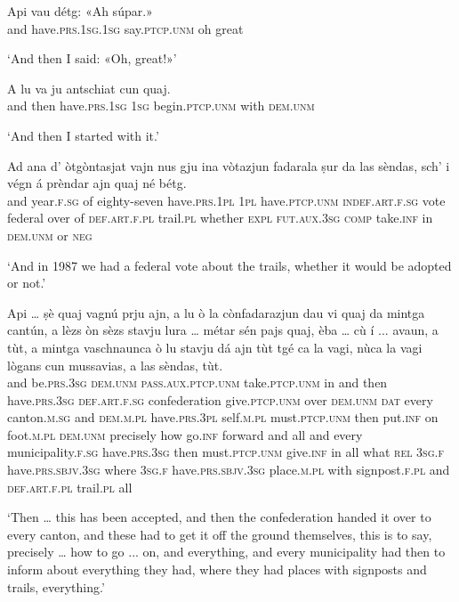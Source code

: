 \begin{linenumbers}
\gll Api vau détg: «Ah súpar.»\\
and have.\textsc{prs.1sg.1sg} say.\textsc{ptcp.unm} oh great\\
\end{linenumbers}
\medskip
\glt `And then I said: «Oh, great!»'
\medskip

\begin{linenumbers}
\gll  A lu va ju antschiat cun quaj.  \\
and then have.\textsc{prs.1sg} \textsc{1sg} begin.\textsc{ptcp.unm} with \textsc{dem.unm}\\
\end{linenumbers}
\medskip
\glt `And then I started with it.'
\medskip

\begin{linenumbers}
\gll Ad ana d' òtgòntasjat vajn nus gju ina vòtazjun fadarala ṣur da las sèndas, sch' i végn á prèndar ajn quaj né bétg.   \\
and year.\textsc{f.sg} of eighty-seven have.\textsc{prs.1pl} \textsc{1pl} have.\textsc{ptcp.unm} \textsc{indef.art.f.sg} vote federal over of \textsc{def.art.f.pl} trail.\textsc{pl} whether \textsc{expl} \textsc{fut.aux.3sg} \textsc{comp} take.\textsc{inf} in \textsc{dem.unm} or \textsc{neg}  \\
\end{linenumbers}
\medskip
\glt `And in 1987 we had a federal vote about the trails, whether it would be adopted or not.'
\medskip

\begin{linenumbers}
\gll Api … ṣè quaj vagnú prju ajn, a lu ò la cònfadarazjun dau vi quaj da mintga cantún, a lèzs òn sèzs stavju lura … métar sén pajs quaj, èba … cù í ... avaun, a tùt, a mintga vaschnaunca ò lu stavju dá ajn tùt tgé ca la vagi, nùca la vagi lògans cun mussavias, a las sèndas, tùt.   \\
and {} be.\textsc{prs.3sg} \textsc{dem.unm} \textsc{pass.aux.ptcp.unm} take.\textsc{ptcp.unm} in and then have.\textsc{prs.3sg} \textsc{def.art.f.sg} confederation give.\textsc{ptcp.unm} over \textsc{dem.unm} \textsc{dat} every canton.\textsc{m.sg} and \textsc{dem.m.pl} have.\textsc{prs.3pl} self.\textsc{m.pl} must.\textsc{ptcp.unm} then {} put.\textsc{inf} on foot.\textsc{m.pl} \textsc{dem.unm} precisely {} how go.\textsc{inf} {} forward and all and every municipality.\textsc{f.sg} have.\textsc{prs.3sg} then must.\textsc{ptcp.unm} give.\textsc{inf} in all what \textsc{rel} \textsc{3sg.f} have.\textsc{prs.sbjv.3sg} where \textsc{3sg.f} have.\textsc{prs.sbjv.3sg} place.\textsc{m.pl} with signpost.\textsc{f.pl} and \textsc{def.art.f.pl} trail.\textsc{pl} all \\
\end{linenumbers}
\medskip
\glt `Then … this has been accepted, and then the confederation handed it over to every canton, and these had to get it off the ground themselves, this is to say, precisely … how to go ... on, and everything, and every municipality had then to inform about everything they had, where they had places with signposts and trails, everything.'
\medskip

